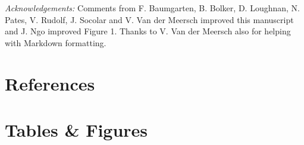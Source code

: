 \documentclass[11pt]{article}
\begin{document}

\emph{Acknowledgements:} Comments from F. Baumgarten, B. Bolker, D. Loughnan, N. Pates, V. Rudolf, J. Socolar and V. Van der Meersch improved this manuscript and J. Ngo improved Figure 1. Thanks to V. Van der Meersch also for helping with Markdown formatting. %

\newpage
\section*{References}
\vspace{-5ex}


\clearpage

\section*{Tables \& Figures}
\end{document}
